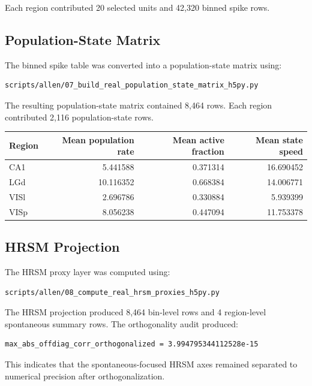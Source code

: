 Each region contributed 20 selected units and 42,320 binned spike rows.

\subsection{Population-State Matrix}

The binned spike table was converted into a population-state matrix using:

\begin{verbatim}
scripts/allen/07_build_real_population_state_matrix_h5py.py
\end{verbatim}

The resulting population-state matrix contained 8,464 rows. Each region contributed 2,116 population-state rows.

\begin{center}
\begin{tabular}{lrrr}
\hline
Region & Mean population rate & Mean active fraction & Mean state speed \\
\hline
CA1 & 5.441588 & 0.371314 & 16.690452 \\
LGd & 10.116352 & 0.668384 & 14.006771 \\
VISl & 2.696786 & 0.330884 & 5.939399 \\
VISp & 8.056238 & 0.447094 & 11.753378 \\
\hline
\end{tabular}
\end{center}

\subsection{HRSM Projection}

The HRSM proxy layer was computed using:

\begin{verbatim}
scripts/allen/08_compute_real_hrsm_proxies_h5py.py
\end{verbatim}

The HRSM projection produced 8,464 bin-level rows and 4 region-level spontaneous summary rows. The orthogonality audit produced:

\begin{verbatim}
max_abs_offdiag_corr_orthogonalized = 3.994795344112528e-15
\end{verbatim}

This indicates that the spontaneous-focused HRSM axes remained separated to numerical precision after orthogonalization.

